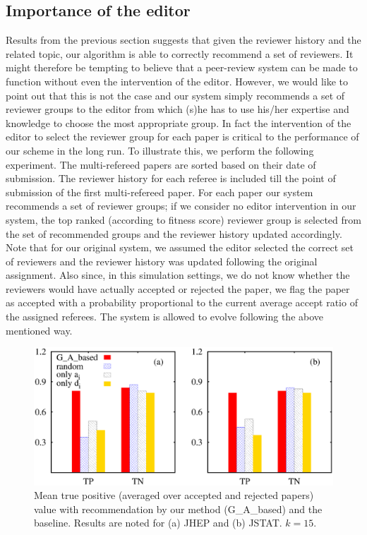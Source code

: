 \noindent
\subsection{Importance of the editor}
\label{editor_imp}

Results from the previous section suggests that given the reviewer history and the related topic, our algorithm is able to correctly recommend a set of reviewers. It might therefore be tempting to believe that a peer-review system can be made to function without even the intervention of the editor. However, we would like to point out that this is not the case and our system simply recommends a set of reviewer groups to the editor from which (s)he has to use his/her expertise and knowledge to choose the most appropriate group. In fact the intervention of the editor to select the reviewer group for each paper is critical to the performance of our scheme in the long run. To illustrate this, we perform the following experiment. The multi-refereed papers are sorted based on their date of submission. The reviewer history for each referee is included till the point of submission of the first multi-refereed paper. For each paper our system recommends a set of reviewer groups; if we consider no editor intervention in our system, the top ranked (according to fitness score) reviewer group is selected from the set of recommended groups and the 
reviewer history updated accordingly. Note that for our original system, we assumed the editor selected the correct set of reviewers and the reviewer history was updated following the original assignment. Also since, in this simulation settings, we do not know whether the reviewers would have actually accepted or rejected the paper, we flag the paper as accepted with a probability proportional to the current average accept ratio of the assigned referees. The system is allowed to evolve following the above mentioned way.   

\begin{figure}
\centering
\includegraphics[scale = 0.35]{./texfiles/Chapter_4/cikm_17/figures/G_A_baseline.eps}
\caption{\label{fig:GA_base} Mean true positive (averaged over accepted and rejected papers) value with recommendation by our method (G\_A\_based) and the baseline. Results are 
noted for (a) JHEP and (b) JSTAT. $k = 15$.\vspace{4mm}}
\end{figure}

